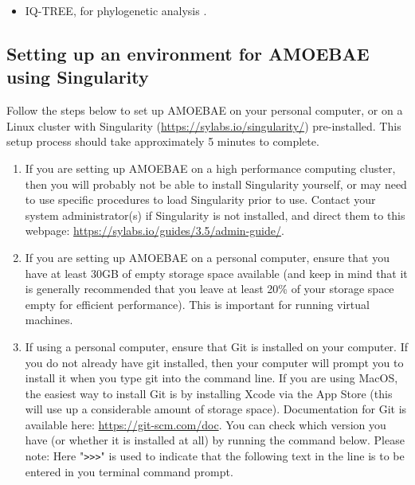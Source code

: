 \documentclass[12pt,letterpaper]{article}
\begin{document}
\begin{linenumbers}
\begin{itemize}
\item IQ-TREE, for phylogenetic analysis \citep{nguyen2015}.


\end{itemize}


\subsection{Setting up an environment for AMOEBAE using Singularity}
\label{setup_section}


Follow the steps below to set up AMOEBAE on your personal computer, or on a
Linux cluster with Singularity (\url{https://sylabs.io/singularity/})
pre-installed. This setup process should take approximately 5 minutes to
complete. 


\begin{enumerate}

\item If you are setting up AMOEBAE on a high performance computing cluster,
    then you will probably not be able to install Singularity yourself, or may
        need to use specific procedures to load Singularity prior to use.
        Contact your system administrator(s) if Singularity is not installed,
        and direct them to this webpage:
        \url{https://sylabs.io/guides/3.5/admin-guide/}.

\item If you are setting up AMOEBAE on a personal computer, ensure that you
    have at least 30GB of empty storage space available (and keep in mind that
        it is generally recommended that you leave at least 20\% of your
        storage space empty for efficient performance). This is important for
        running virtual machines.

\item If using a personal computer, ensure that Git is installed on your
    computer. If you do not already have git installed, then your computer will
        prompt you to install it when you type git into the command line. If
        you are using MacOS, the easiest way to install Git is by installing
        Xcode via the App Store (this will use up a considerable amount of
        storage space). Documentation for Git is available here:
        \url{https://git-scm.com/doc}. You can check which version you have (or
        whether it is installed at all) by running the command below. Please
        note: Here "\texttt{>{}>{}>}" is used to indicate that the following
        text in the line is to be entered in you terminal command prompt. 


\end{enumerate}
\end{linenumbers}
\end{document}
